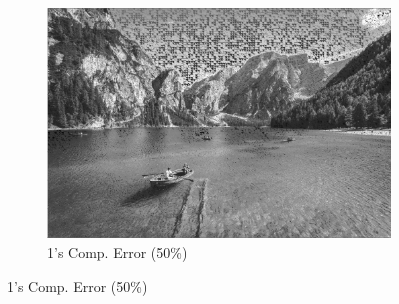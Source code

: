 \documentclass[landscape,a0paper,fontscale=0.5]{baposter} %
\begin{document}
\begin{poster}
{\begin{figure}[H]
\begin{subfigure}{0.3\textwidth}
		\includegraphics[scale=0.085]{9Land.jpg}
		\caption{1's Comp. Error (50\%)} %
	\end{subfigure}
\end{figure}
}


\end{poster}
\end{document}
